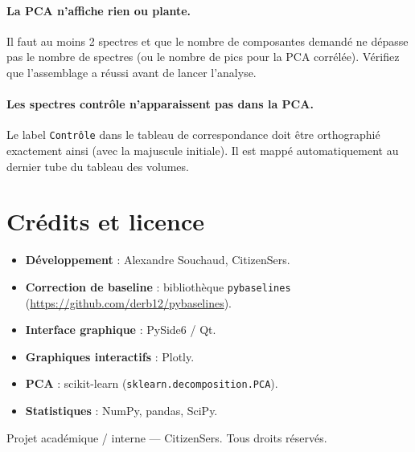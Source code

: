 \documentclass[12pt, a4paper]{article}
\begin{document}
\paragraph{La PCA n'affiche rien ou plante.}
Il faut au moins 2 spectres et que le nombre de composantes demandé ne
dépasse pas le nombre de spectres (ou le nombre de pics pour la PCA
corrélée). Vérifiez que l'assemblage a réussi avant de lancer l'analyse.

\paragraph{Les spectres contrôle n'apparaissent pas dans la PCA.}
Le label \texttt{Contrôle} dans le tableau de correspondance doit être
orthographié exactement ainsi (avec la majuscule initiale). Il est mappé
automatiquement au dernier tube du tableau des volumes.

\section{Crédits et licence}

\begin{itemize}
  \item \textbf{Développement} : Alexandre Souchaud, CitizenSers.
  \item \textbf{Correction de baseline} : bibliothèque \texttt{pybaselines}
        (\url{https://github.com/derb12/pybaselines}).
  \item \textbf{Interface graphique} : PySide6 / Qt.
  \item \textbf{Graphiques interactifs} : Plotly.
  \item \textbf{PCA} : scikit-learn (\texttt{sklearn.decomposition.PCA}).
  \item \textbf{Statistiques} : NumPy, pandas, SciPy.
\end{itemize}

\medskip
Projet académique / interne --- CitizenSers. Tous droits réservés.
\end{document}
